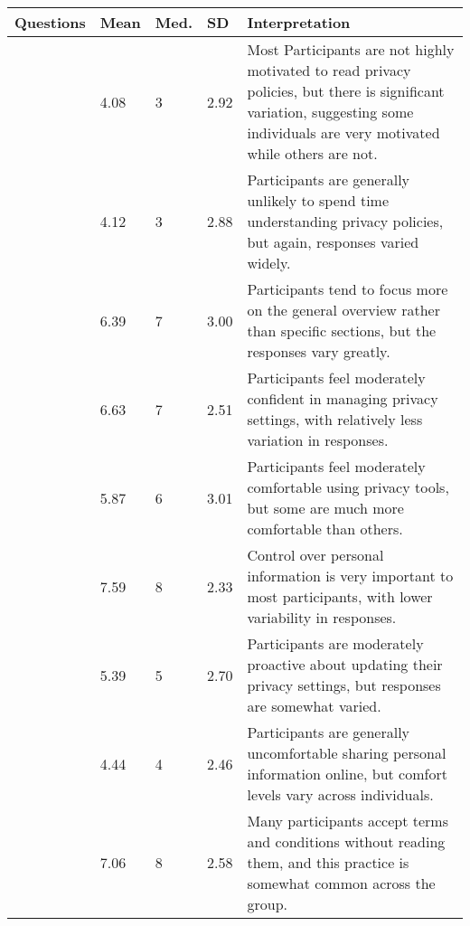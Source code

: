 \begin{table}[htb]
    \centering
    \footnotesize
    \begin{tabular}{@{}p{}|l|l|l|p{}@{}} 
     \textbf{Questions}
     & \textbf{Mean} 
     & \textbf{Med.}
     & \textbf{SD}
     & \textbf{Interpretation} 
     \\\hline

     \qFour{}
     & 4.08  & 3 & 2.92 &
     Most Participants are not highly motivated to read privacy policies, but there is significant variation, suggesting some individuals are very motivated while others are not.  
     \\\hline

      \qFive{}
      & 4.12	& 3	& 2.88 &
      Participants are generally unlikely to spend time understanding privacy policies, but again, responses varied widely.
     \\\hline
     
     \qSix{}
      & 6.39	& 7	& 3.00 &
      Participants tend to focus more on the general overview rather than specific sections, but the responses vary greatly.
     \\\hline
     
     \qSeven{}
      & 6.63	& 7	& 2.51 & Participants feel moderately confident in managing privacy settings, with relatively less variation in responses.
     \\\hline
     
    \qEight{}
     & 5.87	& 6	& 3.01 &
     Participants feel moderately comfortable using privacy tools, but some are much more comfortable than others.
    \\\hline

    \qNine{}
     & 7.59	& 8	& 2.33 &
     Control over personal information is very important to most participants, with lower variability in responses. 
    \\\hline
    
    \qTen{}
     & 5.39	& 5	& 2.70 &
     Participants are moderately proactive about updating their privacy settings, but responses are somewhat varied.
    \\\hline
    
    \qEleven{}
     & 4.44	& 4	& 2.46 & 
     Participants are generally uncomfortable sharing personal information online, but comfort levels vary across individuals.
    \\\hline
    
    \qTwelve{}
     & 7.06	& 8	& 2.58 &
     Many participants accept terms and conditions without reading them, and this practice is somewhat common across the group.
    \\\hline


\end{tabular}
\end{table}

